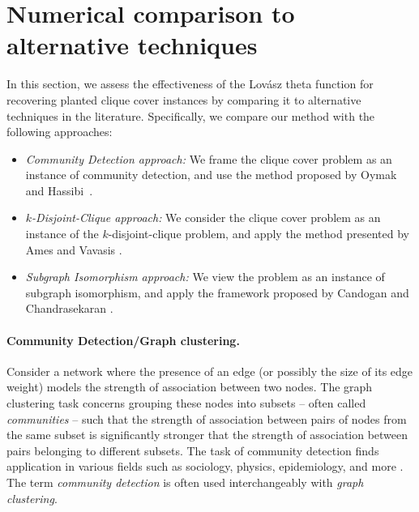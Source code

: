 \section{Numerical comparison to alternative  techniques } \label{subsec:related worlk}
In this section, we assess the effectiveness of the Lov\'asz theta function for recovering planted clique cover instances by comparing it to alternative techniques in the literature.  Specifically, we compare our method with the following approaches:

\begin{itemize} 
\item {\em Community Detection approach:}  We frame the clique cover problem as an instance of community detection, and use the method proposed by Oymak and Hassibi~\cite{OH:11}.

\item {\em $k$-Disjoint-Clique approach: } We consider the clique cover problem as an instance of the $k$-disjoint-clique problem, and apply the method presented by Ames and Vavasis \cite{AV:14}.

\item {\em Subgraph Isomorphism approach:}  We view the problem as an instance of  subgraph isomorphism, and apply the framework proposed by Candogan and Chandrasekaran \cite{CC:18}.
\end{itemize}



\paragraph{Community Detection/Graph clustering.}  Consider a network where the presence of an edge (or possibly the size of its edge weight) models the strength of association between two nodes.  The graph clustering task concerns grouping these nodes into subsets -- often called {\em communities} -- such that the strength of association between pairs of nodes from the same subset is significantly stronger that the strength of association between pairs belonging to different subsets.  The task of community detection finds application in various fields such as sociology, physics, epidemiology, and more \cite{For:10,New:06}. The term {\em community detection} is often used interchangeably with {\em graph clustering}. %

